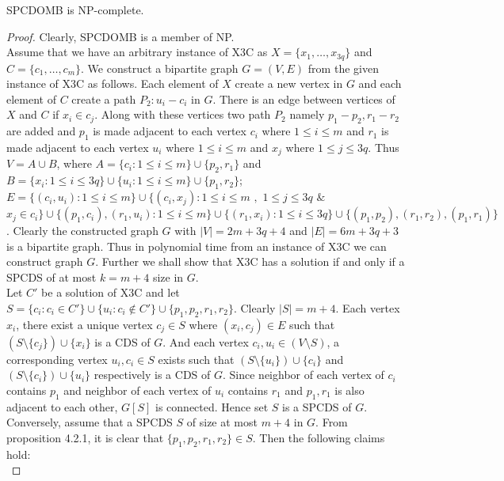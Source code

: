 \begin{theorem}
SPCDOMB is NP-complete.
\begin{proof}
Clearly, SPCDOMB is a member of NP.\\
\noindent Assume that we have an arbitrary instance of X3C as $X=\lbrace x_1,\ldots ,x_{3q} \rbrace$ and $C=\lbrace c_1, \ldots,c_m \rbrace$. We construct a bipartite graph $G=(V,E)$ from the given instance of X3C as follows. Each element of $X$ create a new vertex in $G$ and each element of $C$ create a path $P_2:u_i-c_i$ in $G$. There is an edge between vertices of $X$ and $C$ if $x_i \in c_j$. Along with these vertices two path $P_2$ namely $p_1-p_2, r_1-r_2$ are added and $p_1$ is made adjacent to each vertex $c_i$ where $1 \leq i \leq m$ and $r_1$ is made adjacent to each vertex $u_i$ where $1 \leq i \leq m$ and $x_j$ where $1 \leq j \leq 3q$. Thus $V = A \cup B$, where $A=\lbrace c_i : 1 \leq i \leq m \rbrace \cup \lbrace p_2, r_1 \rbrace $ and $B=\lbrace x_i : 1 \leq i \leq 3q \rbrace \cup \lbrace u_i : 1 \leq i \leq m \rbrace \cup \lbrace p_1, r_2 \rbrace $; $E=\lbrace (c_i,u_i): 1\leq i \leq m \rbrace \cup \lbrace (c_i,x_j):1 \leq i \leq m$ $,$ $1 \leq j \leq 3q$ $\&$ $ x_j \in c_i \rbrace \cup \lbrace (p_1,c_i), (r_1,u_i): 1\leq i \leq m \rbrace \cup \lbrace (r_1,x_i): 1\leq i \leq 3q \rbrace \cup \lbrace (p_1,p_2),(r_1,r_2),(p_1,r_1) \rbrace $. Clearly the constructed graph $G$ with $|V|=2m+3q+4$ and  $|E|=6m+3q+3$ is a bipartite graph. Thus in polynomial time from an instance of X3C we can construct graph $G$. Further we shall show that X3C has a solution if and only if a SPCDS of at most $k=m+4$ size in $G$.\\
Let $C'$ be a solution of X3C and let $S = \lbrace c_i:c_i \in C' \rbrace \cup \lbrace u_i:c_i \notin C' \rbrace \cup \lbrace p_1,p_2,r_1,r_2 \rbrace$. Clearly $|S|=m+4$. Each vertex $x_i$, there exist a unique vertex $c_j \in S $ where $(x_i,c_j)\in E$ such that $(S\setminus \lbrace c_j \rbrace) \cup \lbrace x_i \rbrace $ is a CDS of $G$. And each vertex $c_i,u_i\in (V \setminus S)$, a corresponding vertex $u_i,c_i \in S$ exists such that $(S\setminus \lbrace u_i \rbrace) \cup \lbrace c_i \rbrace$ and $(S\setminus \lbrace c_i \rbrace) \cup \lbrace u_i \rbrace $ respectively is a CDS of $G$. Since neighbor of each vertex of $c_i$ contains $p_1$ and neighbor of each vertex of $u_i$ contains $r_1$ and $p_1,r_1$ is also adjacent to each other, $G[S]$ is connected. Hence set $S$ is a SPCDS of $G$.\\
Conversely, assume that a SPCDS $S$ of size at most $m+4$ in $G$. From proposition 4.2.1, it is clear that $ \lbrace p_1,p_2,r_1,r_2 \rbrace \in S$. Then the following claims hold:\\

\end{proof}
\end{theorem}
